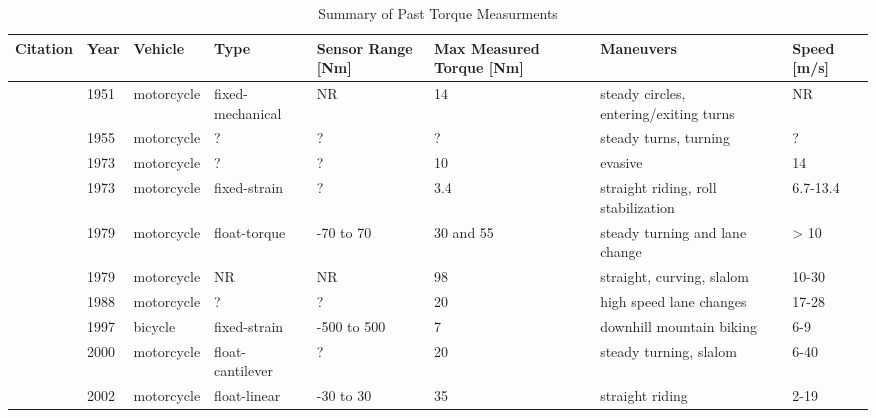 \documentclass[10pt]{article}
\begin{document}
\begin{table}[!ht]
  \caption{Summary of Past Torque Measurments}
  \begin{tabular}{llllllll}
    \toprule
    Citation                              &  Year &     Vehicle &              Type & Sensor Range [Nm] & Max Measured Torque [Nm] &                               Maneuvers & Speed [m/s] \\
    \midrule
    \cite{Wilson-Jones1951}               &  1951 &  motorcycle &  fixed-mechanical &                NR &                       14 &  steady circles, entering/exiting turns &          NR \\
    \cite{Kondo1955}                      &  1955 &  motorcycle &                 ? &                 ? &                        ? &                   steady turns, turning &           ? \\
    \cite{Watanabe1973}                   &  1973 &  motorcycle &                 ? &                 ? &                       10 &                                 evasive &          14 \\
    \cite{Eaton1973}                      &  1973 &  motorcycle &      fixed-strain &                 ? &                      3.4 &     straight riding, roll stabilization &    6.7-13.4 \\
    \cite{Weir1979a}                      &  1979 &  motorcycle &      float-torque &         -70 to 70 &                30 and 55 &          steady turning and lane change &        > 10 \\
    \cite{Aoki1979}                       &  1979 &  motorcycle &                NR &                NR &                       98 &               straight, curving, slalom &       10-30 \\
    \cite{Sugizaki1988}                   &  1988 &  motorcycle &                 ? &                 ? &                       20 &                 high speed lane changes &       17-28 \\
    \cite{Lorenzo1997,Lorenzo1999}        &  1997 &     bicycle &      fixed-strain &       -500 to 500 &                        7 &                downhill mountain biking &         6-9 \\
    \cite{Bortoluzzi2000,Biral2003}       &  2000 &  motorcycle &  float-cantilever &                 ? &                       20 &                  steady turning, slalom &        6-40 \\
    \cite{James2002a,James2002,James2005} &  2002 &  motorcycle &      float-linear &         -30 to 30 &                       35 &                         straight riding &        2-19 \\

\end{tabular}
\end{table}
\end{document}
